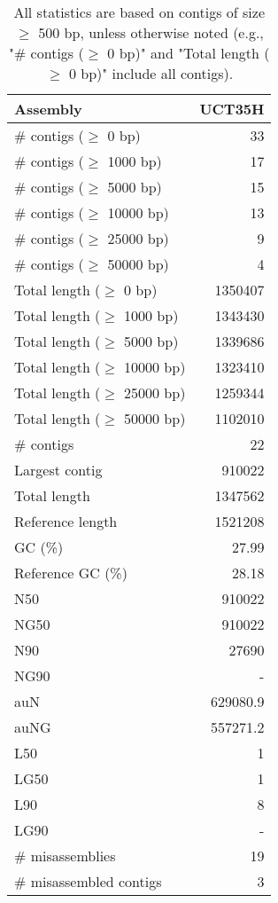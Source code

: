 \documentclass[12pt,a4paper]{article}
\begin{document}
\begin{table}[ht]
\begin{center}
\caption{All statistics are based on contigs of size $\geq$ 500 bp, unless otherwise noted (e.g., "\# contigs ($\geq$ 0 bp)" and "Total length ($\geq$ 0 bp)" include all contigs).}
\begin{tabular}{|l*{1}{|r}|}
\hline
Assembly & UCT35H \\ \hline
\# contigs ($\geq$ 0 bp) & 33 \\ \hline
\# contigs ($\geq$ 1000 bp) & 17 \\ \hline
\# contigs ($\geq$ 5000 bp) & 15 \\ \hline
\# contigs ($\geq$ 10000 bp) & 13 \\ \hline
\# contigs ($\geq$ 25000 bp) & 9 \\ \hline
\# contigs ($\geq$ 50000 bp) & 4 \\ \hline
Total length ($\geq$ 0 bp) & 1350407 \\ \hline
Total length ($\geq$ 1000 bp) & 1343430 \\ \hline
Total length ($\geq$ 5000 bp) & 1339686 \\ \hline
Total length ($\geq$ 10000 bp) & 1323410 \\ \hline
Total length ($\geq$ 25000 bp) & 1259344 \\ \hline
Total length ($\geq$ 50000 bp) & 1102010 \\ \hline
\# contigs & 22 \\ \hline
Largest contig & 910022 \\ \hline
Total length & 1347562 \\ \hline
Reference length & 1521208 \\ \hline
GC (\%) & 27.99 \\ \hline
Reference GC (\%) & 28.18 \\ \hline
N50 & 910022 \\ \hline
NG50 & 910022 \\ \hline
N90 & 27690 \\ \hline
NG90 & - \\ \hline
auN & 629080.9 \\ \hline
auNG & 557271.2 \\ \hline
L50 & 1 \\ \hline
LG50 & 1 \\ \hline
L90 & 8 \\ \hline
LG90 & - \\ \hline
\# misassemblies & 19 \\ \hline
\# misassembled contigs & 3 \\ \hline

\end{tabular}
\end{center}
\end{table}
\end{document}
